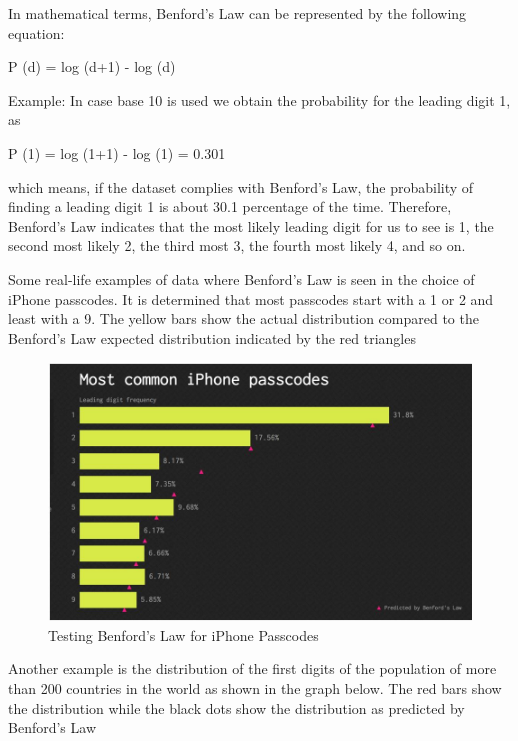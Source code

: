 In mathematical terms, Benford’s Law can be represented 
by the following equation:

P (d) = log (d+1) - log (d)

Example: In case base 10 is used we obtain the 
probability for the leading digit 1, as

P (1) = log (1+1) - log (1) = 0.301

which means, if the dataset complies 
with Benford's Law, the probability of finding a 
leading digit 1 is about 30.1 percentage of the time. 
Therefore, Benford’s Law indicates that the most 
likely leading digit for us to see is 1, the second 
most likely 2, the third most 3, the fourth most 
likely 4, and so on.

Some real-life examples of data where Benford’s Law is 
seen in the choice of iPhone passcodes. 
It is determined that most passcodes start with a 1 or  
2 and least with a 9. The yellow bars show the actual
distribution compared to the Benford’s 
Law expected distribution indicated by the 
red triangles~\cite{hid-sp18-514-iphone-benford}

\begin{figure}[!ht]
\centering\includegraphics[width=\columnwidth]{images/iphone_benford.JPG}
  \caption{Testing Benford's Law for iPhone Passcodes}\label{f:iphone-passcode_benford}
\end{figure}


Another example is the distribution of the first 
digits of the population of more than 200 countries 
in the world as shown in the graph below. 
The red bars show the distribution while 
the black dots show the distribution as 
predicted by Benford’s Law~\cite{hid-sp18-514-benfordwiki}

